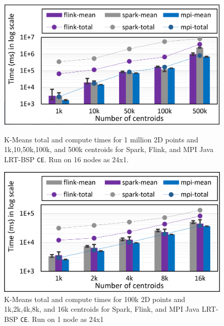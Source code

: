 \documentclass[10pt, conference, compsocconf]{IEEEtran}
\begin{document}
\begin{figure}[!htb]
	\begin{minipage}{0.49\textwidth}
        \centering
        \includegraphics[width=1\columnwidth]{images/fig_kmeans_1mil_varying_centers_Flink_Spark_MPI}
        \caption{K-Means total and compute times for 1 million 2D points and 1k,10,50k,100k, and 500k centroids for Spark, Flink, and \ac{MPI} Java \ac{LRT-BSP} \texttt{CE}. Run on 16 nodes as 24x1.}
        \label{fig:fig_kmeans_1mil_varying_centers_Flink_Spark_MPI}
    \end{minipage}
    \hspace{1.4mm}
    \begin{minipage}{0.49\textwidth}
        \centering
        \includegraphics[width=1\columnwidth]{images/fig_kmeans_100k_varying_centers_Flink_Spark_MPI}
        \caption{K-Means total and compute times for 100k 2D points and 1k,2k,4k,8k, and 16k centroids for Spark, Flink, and \ac{MPI} Java \ac{LRT-BSP} \texttt{CE}. Run on 1 node as 24x1}
        \label{fig:fig_kmeans_100k_varying_centers_Flink_Spark_MPI}
    \end{minipage}
\end{figure}
\end{document}
